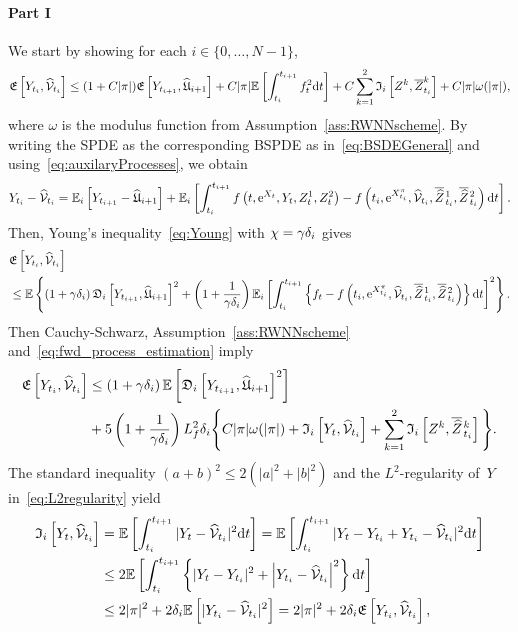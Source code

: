 \paragraph{\textbf{Part I}} We start by showing for each $i\in\{0, \dots, N-1\}$,
\begin{equation}\label{eq:convergence_part1_result}
\mathfrak{E}\left[Y_{t_i}, \widehat{\mathcal{V}}_{t_i}\right]
\leq (1+C|\pi|) \mathfrak{E}\left[Y_{t_{i+1}}, \widehat{\mathfrak{U}}_{i+1}\right]
 +C|\pi| \mathbb{E}\left[\int_{t_i}^{t_{i+1}}f_{t}^2 \mathrm{d} t\right] 
 + C \sum_{k=1}^{2}\mathfrak{I}_i\left[Z^k, \overline{Z}^{k}_{t_i}\right] + C |\pi|\omega(|\pi|),
\end{equation}
where $\omega$ is the modulus function from Assumption~\ref{ass:RWNNscheme}. 
By writing the SPDE as the corresponding BSPDE as in~\eqref{eq:BSDEGeneral} and using~\eqref{eq:auxilaryProcesses}, we obtain
\[
Y_{t_i}-\widehat{\mathcal{V}}_{t_i} = 
\mathbb{E}_i\left[Y_{t_{i+1}}-\widehat{\mathfrak{U}}_{i+1}\right]+\mathbb{E}_i\left[\int_{t_i}^{t_{i+1}} f\left(t, \mathrm{e}^{X_t}, Y_t, Z^1_t, Z^2_t\right)-f\left(t_i, \mathrm{e}^{X^\pi_{t_i}}, \widehat{\mathcal{V}}_{t_i}, \overline{\widehat{Z}}\kern0.1em^{1}_{t_{i}}, \overline{\widehat{Z}}\kern0.1em^{2}_{t_{i}}\right) \mathrm{d} t\right].
\]
Then, Young's inequality~\eqref{eq:Young} with $\chi = \gamma\delta_{i}$ gives
\begin{equation}
\begin{aligned}
&\mathfrak{E}\left[Y_{t_i}, \widehat{\mathcal{V}}_{t_i}\right] \\
& \leq \mathbb{E}\left\{\left(1+\gamma \delta_{i} \right)
\mathfrak{D}_i\left[Y_{t_{i+1}}, \widehat{\mathfrak{U}}_{i+1}\right]^{2}
 + \left(1+\frac{1}{\gamma \delta_{i} }\right)\mathbb{E}_i\left[\int_{t_i}^{t_{i+1}}\left\{
f_{t}-f\left(t_i, \mathrm{e}^{X^\pi_{t_i}}, \widehat{\mathcal{V}}_{t_i}, \overline{\widehat{Z}}\kern0.1em^{1}_{t_{i}}, \overline{\widehat{Z}}\kern0.1em^{2}_{t_{i}}\right)\right\} \mathrm{d} t\right]^2\right\}.
\end{aligned}
\end{equation}
Then Cauchy-Schwarz, Assumption~\ref{ass:RWNNscheme} and~\eqref{eq:fwd_process_estimation} imply
\begin{align}\label{eq:convergence_part1_0}
\begin{split}
\mathfrak{E}\left[Y_{t_i}, \widehat{\mathcal{V}}_{t_i}\right] &\leq \left(1+\gamma \delta_{i} \right) \mathbb{E}\left[\mathfrak{D}_i\left[Y_{t_{i+1}}, \widehat{\mathfrak{U}}_{i+1}\right]^2\right] \\ 
& + 5\left(1+\frac{1}{\gamma \delta_{i} }\right) L_f^2 \delta_{i} \Bigg\{C |\pi| \omega(|\pi|)
+ \mathfrak{I}_i\left[Y_t, \widehat{\mathcal{V}}_{t_i}\right] + \sum_{k=1}^{2}\mathfrak{I}_i\left[Z^k, \overline{\widehat{Z}}\kern0.1em^{k}_{t_i}\right]\Bigg\}.
\end{split}
\end{align}
The standard inequality $(a+b)^2\leq 2(|a|^2+|b|^2)$ and the $L^2$-regularity of~$Y$ in~\eqref{eq:L2regularity} yield
\begin{align*}
\mathfrak{I}_i\left[Y_t, \widehat{\mathcal{V}}_{t_i}\right] 
 & = \mathbb{E}\left[\int_{t_i}^{t_{i+1}}|Y_t - \widehat {\mathcal{V}}_{t_i}|^2\mathrm{d} t\right] = \mathbb{E}\left[\int_{t_i}^{t_{i+1}}|Y_t-Y_{t_i}+Y_{t_i}-\widehat{\mathcal{V}}_{t_i}|^2 \mathrm{d} t\right]\\
  & \leq 2 \mathbb{E}\left[\int_{t_i}^{t_{i+1}}
\left\{|Y_t-Y_{t_i}|^2 + \left|Y_{t_i}-\widehat{\mathcal{V}}_{t_i}\right|^2\right\} \mathrm{d} t\right] \\
 & \leq 2|\pi|^2 + 2\delta_{i}\mathbb{E}\left[|Y_{t_i}-\widehat{\mathcal{V}}_{t_i}|^2\right]
 = 2|\pi|^2 + 2\delta_{i}\mathfrak{E}\left[Y_{t_i}, \widehat{\mathcal{V}}_{t_i}\right],
\end{align*}
